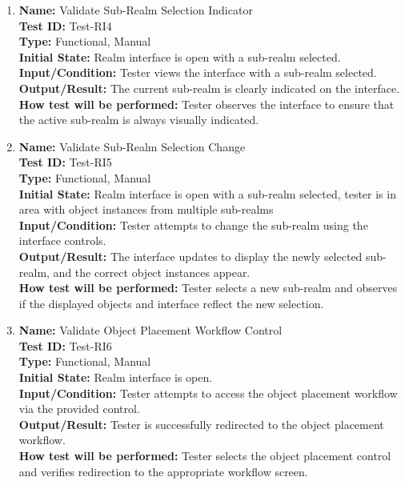 \documentclass[12pt, titlepage]{article}
\begin{document}
\begin{enumerate}
\item \textbf{Name:} Validate Sub-Realm Selection Indicator \label{itm:Test-RI4} \\
\textbf{Test ID:} Test-RI4 \\
\textbf{Type:} Functional, Manual \\
\textbf{Initial State:} Realm interface is open with a sub-realm selected. \\
\textbf{Input/Condition:} Tester views the interface with a sub-realm selected. \\
\textbf{Output/Result:} The current sub-realm is clearly indicated on the interface. \\
\textbf{How test will be performed:} Tester observes the interface to ensure that the active sub-realm is always visually indicated.

\item \textbf{Name:} Validate Sub-Realm Selection Change \label{itm:Test-RI5} \\
\textbf{Test ID:} Test-RI5 \\
\textbf{Type:} Functional, Manual \\
\textbf{Initial State:} Realm interface is open with a sub-realm selected, tester is in area with object instances from multiple sub-realms \\
\textbf{Input/Condition:} Tester attempts to change the sub-realm using the interface controls. \\
\textbf{Output/Result:} The interface updates to display the newly selected sub-realm, and the correct object instances appear. \\ \textbf{How test will be performed:} Tester selects a new sub-realm and observes if the displayed objects and interface reflect the new selection.


\item \textbf{Name:} Validate Object Placement Workflow Control \label{itm:Test-RI6} \\
\textbf{Test ID:} Test-RI6 \\
\textbf{Type:} Functional, Manual \\
\textbf{Initial State:} Realm interface is open. \\
\textbf{Input/Condition:} Tester attempts to access the object placement workflow via the provided control. \\
\textbf{Output/Result:} Tester is successfully redirected to the object placement workflow. \\
\textbf{How test will be performed:} Tester selects the object placement control and verifies redirection to the appropriate workflow screen.


\end{enumerate}
\end{document}
